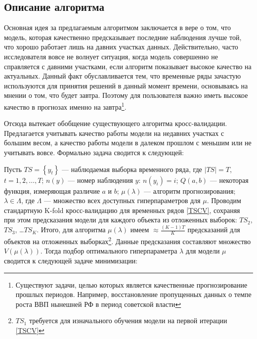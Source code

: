 \documentclass[a4paper, 14pt]{article}
\begin{document}
\subsection{Описание алгоритма}

Основная идея за предлагаемым алгоритмом заключается в вере о том, что модель, которая качественно предсказывает последние наблюдения лучше той, что хорошо работает лишь на давних участках данных. Действительно, часто исследователя вовсе не волнует ситуация, когда модель совершенно не справляется с давними участками, если алгоритм показывает высокое качество на актуальных. Данный факт обуславливается тем, что временные ряды зачастую используются для принятия решений в данный момент времени, основываясь на мнении о том, что будет завтра. Поэтому для пользователя важно иметь высокое качество в прогнозах именно на завтра\footnote{Существуют задачи, целью которых является качественные прогнозирование прошлых периодов. Например, восстановление пропущенных данных о темпе роста ВВП нынешней РФ в период советской власти}. 

Отсюда вытекает обобщение существующего алгоритма кросс-валидации. Предлагается учитывать качество работы модели на недавних участках с большим весом, а качество работы модели в далеком прошлом с меньшим или не учитывать вовсе. Формально задача сводится к следующей:

\noindent Пусть $TS = \left\{y_t\right\}$ --- наблюдаемая выборка временного ряда, где $\left|TS\right| = T$, $t = 1, 2, \dots,  T$; $n(y)$ --- номер наблюдения $y$: $n(y_i) = i$; $Q(a,b)$ --- некоторая функция, измеряющая различие $a$ и $b$; $\mu (\lambda)$ --- алгоритм прогнозирования; $\lambda \in \Lambda$, где $\Lambda$ --- множество всех доступных гиперпараметров для $\mu$. Проводим стандартную K-fold кросс-валидацию для временных рядов \eqref{TSCV}, сохраняя при этом предсказания модели для каждого объекта из отложенных выборок: $TS_2$, $TS_3$, \dots $TS_K$. Итого, для алгоритма $\mu(\lambda)$ имеем $\approx \frac{(K-1)T}{K}$ предсказаний для объектов на отложенных выборках\footnote{$TS_1$ требуется для изначального обучения модели на первой итерации \eqref{TSCV}}. Данные предсказания составляют множество $V(\mu(\lambda))$. Тогда подбор оптимального гиперпараметра $\lambda$ для модели $\mu$ сводится к следующей задаче минимизации:
\end{document}
